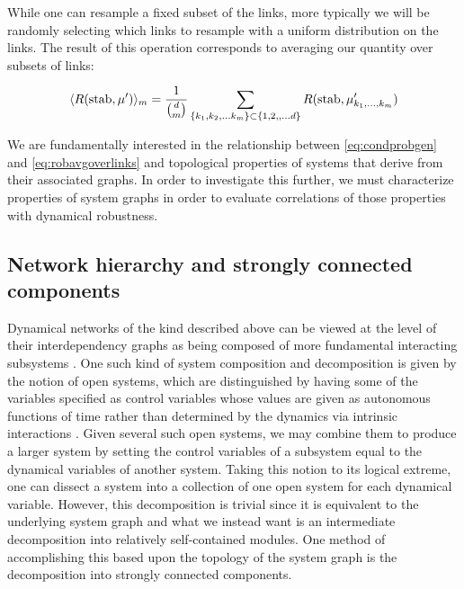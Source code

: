 While one can resample a fixed subset of the links, more typically we will be randomly selecting which links to resample with a uniform distribution on the links.  The result of this operation corresponds to averaging our quantity over subsets of links:
\begin{widetext}
\begin{equation}\label{eq:robavgoverlinks}
\langle R (\hbox{stab}, \mu') \rangle_m =
\frac{1}{\binom{d}{m}}
\sum_{\{k_1, k_2, \ldots k_m\} \subset \{1, 2,, \ldots d\}}
R (\hbox{stab}, \mu'_{k_1, \ldots, k_m})
\end{equation}
\end{widetext}
We are fundamentally interested in the relationship between \ref{eq:condprobgen} and \ref{eq:robavgoverlinks} and topological properties of systems that derive from their associated graphs. In order to investigate this further, we must characterize properties of system graphs in order to evaluate correlations of those properties with dynamical robustness.

\subsection{Network hierarchy and strongly connected components}

Dynamical networks of the kind described above can be viewed at the level of their interdependency graphs as being composed of more fundamental interacting subsystems . One such kind of system composition and decomposition is given by the notion of open systems, which are distinguished by having some of the variables specified as control variables whose values are given as autonomous functions of time rather than determined by the dynamics via intrinsic interactions \cite{Vagner2014}.  Given several such open systems, we may combine them to produce a larger system by setting the control variables of a subsystem equal to the dynamical variables of another system.  Taking this notion to its logical extreme, one can dissect a system into a collection of one open system for each dynamical variable.  However, this decomposition is trivial since it is equivalent to the underlying system graph and what we instead want is an intermediate decomposition into relatively self-contained modules.  One method of accomplishing this based upon the topology of the system graph is the decomposition into strongly connected components.

